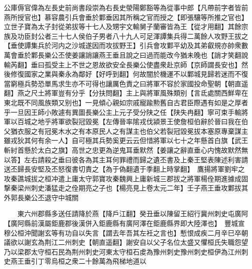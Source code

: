 公庫傉官偉為左長史前尚書段崇為右長史滎陽鄭豁等為從事中郎【凡帶前字者皆前燕所授官也】慕容農引兵會垂於鄴垂因其所稱之官而授之【即張驤等所推之官也】立世子寶為太子封從弟拔等十七人及甥宇文輸舅子蘭審皆為王【從才用翻】其餘宗族及功臣封公者三十七人侯伯子男者八十九人可足渾譚集兵得二萬餘人攻野王拔之【垂使譚集兵於河内之沙城遂因而攻拔野王】引兵會攻鄴平幼及其弟叡規亦帥衆數萬會垂於鄴長樂公丕使姜讓誚讓燕王垂且說之曰過而能改今猶未晚也【誚才笑翻說輸芮翻】垂曰孤受主上不世之恩故欲安全長樂公使盡衆赴京師【京師謂長安也】然後修復國家之業與秦永為鄰好【好呼到翻】何故闇於機運不以鄴城見歸若迷而不復當窮極兵勢恐單馬求生亦不可得也讓厲色責之曰將軍不容於家國投命聖朝【朝直遥翻】燕之尺土將軍豈有分乎【分扶問翻】主上與將軍風殊類别【言氐處關西鮮卑在東北既不同風族類又别也】一見傾心親如宗戚寵踰勲舊自古君臣際遇有如是之厚者乎一旦因王師小敗遽有異圖長樂公主上元子受分陕之任【陕失冉翻】寧可束手輸將軍以百城之地乎將軍欲裂冠毀冕【左傳晉率隂戎伐潁景王使詹桓伯辭於晉曰我在伯父猶衣服之有冠冕木水之有本原民人之有謀主也伯父若裂冠毀冕拔本塞原專棄謀主雖戎狄其何有余一人】自可極其兵勢奚更云云但惜將軍以七十之年懸首白旗【武王斬紂首懸於太白之旗】高世之忠更為逆鬼耳垂默然【姜讓之辭直垂心内愧故默然無以答】左右請殺之垂曰彼各為其主耳何罪禮而歸之遺丕書及上秦王堅表陳述利害請送丕歸長安堅及丕怒復書切責之【為于偽翻遺于季翻上時掌翻】　鷹揚將軍劉牢之攻秦譙城拔之桓冲遣上庸太守郭寶攻秦魏興上庸新城三郡拔之將軍楊佺期進據成固撃秦梁州刺史潘猛走之佺期亮之子也【楊亮見上卷太元二年】壬子燕王垂攻鄴拔其外郭長樂公丕退守中城關

　　東六州郡縣多送任請降於燕【降戶江翻】癸丑垂以陳留王紹行冀州刺史屯廣阿【廣阿縣前漢屬鉅鹿郡後漢併入鉅鹿縣有廣阿澤在鉅鹿縣界即大陸澤也】　豐城宣穆公桓沖聞謝玄等有功自以失言【謂去年吾其左衽之言也】慙恨成疾二月辛巳卒朝議欲以謝玄為荆江二州刺史【朝直遥翻】謝安自以父子名位太盛又懼桓氏失職怨望乃以梁郡太守桓石民為荆州刺史河東太守桓石䖍為豫州刺史豫州刺史桓伊為江州刺史燕王垂引丁零烏桓之衆二十餘萬為飛梯地道以

